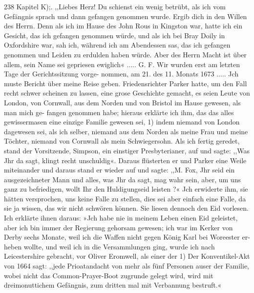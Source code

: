 238 Kapitel K);.
,,Liebes Herz!
Du schienst ein wenig betrübt, als ich vom Gefängnis sprach
und dann gefangen genommen wurde. Ergib dich in den Willen
des Herrn. Denn als ich im Hause des John Rous in Kingston
war, hatte ich ein Gesicht, das ich gefangen genommen würde,
und als ich bei Bray Doily in Oxfordshire war, sah ich, während
ich am Abendessen sas, das ich gefangen genommen und Leiden
zu erdulden haben würde. Aber des Herrn Macht ist über allem, sein
Name sei gepriesen ewiglich« ..... G. F.
Wir wurden erst am letzten Tage der Gerichtssitzung vorge-
nommen, am 21. des 11. Monats 1673 ..... Jch muste
Bericht über meine Reise geben. Friedensrichter Parker hatte,
um den Fall recht schwer scheinen zu lassen, eine grose Geschichte
gemacht, es seien Leute von London, von Cornwall, aus dem
Norden und von Bristol im Hause gewesen, als man mich ge-
fangen genommen habe; hieraus erklärte ich ihm, das das alles
gewissermasen eine einzige Familie gewesen sei, 1) indem niemand von
London dagewesen sei, als ich selber, niemand aus dem Norden als
meine Frau und meine Töchter, niemand von Cornwall als mein
Schwiegersohn.
Als ich fertig geredet, stand der Vorsitzende, Simpson, ein
einstiger Presbyterianer, auf und sagte: ,,Was Jhr da sagt, klingt
recht unschuldig«. Daraus flüsterten er und Parker eine Weile
miteinander und daraus stand er wieder auf und sagte: ,,M. Fox,
Jhr seid ein ausgezeichneter Mann und alles, was Jhr da sagt,
mag wahr sein, aber, um uns ganz zu befriedigen, wollt Ihr den
Huldigungseid leisten ?« Jch erwiderte ihm, sie hätten versprochen,
uns keine Falle zu stellen, dies sei aber einfach eine Falle, da sie
ja wissen, das wir nicht schwören können. Sie liesen dennoch
den Eid vorlesen. Ich erklärte ihnen daraus: »Jch habe nie in
meinem Leben einen Eid geleistet, aber ich bin immer der Regierung
gehorsam gewesen; ich war im Kerker von Derby sechs Monate,
weil ich die Waffen nicht gegen König Karl bei Woreester er-
heben wollte, und weil ich in die Versammlungen ging, wurde
ich nach Leicestershire gebracht, vor Oliver Eromwell, als einer der
1) Der Konventikel-Akt von 1664 sagt: ,,jede Prioatandacht von mehr
als fünf Personen auser der Familie, wobei nicht das Common-Prayer-Boot
zugrunde gelegt wird, wird mit dreimonuttichem Gefängnis, zum dritten mal
mit Verbannung bestruft.«



